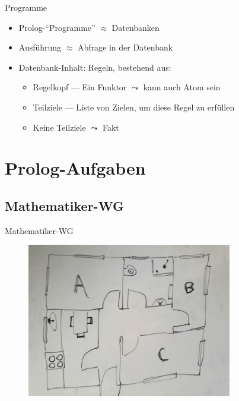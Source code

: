 \documentclass{beamer}
\begin{document}

\begin{frame}{Programme}
	\begin{itemize}
		\item Prolog-\enquote{Programme} $\approx$ Datenbanken
		\item Ausführung $\approx$ Abfrage in der Datenbank
		\item Datenbank-Inhalt: Regeln, bestehend aus:
		\begin{itemize}
			\item Regelkopf --- Ein Funktor $\leadsto$ kann auch Atom sein
			\item Teilziele --- Liste von Zielen, um diese Regel zu erfüllen
			\item Keine Teilziele $\leadsto$ Fakt
		\end{itemize}
	\end{itemize}
\end{frame}

\section{Prolog-Aufgaben}

\subsection{Mathematiker-WG}

\begin{frame}{Mathematiker-WG}
	\begin{figure}
		\includegraphics[width=0.8\textwidth]{images/mathematiker-wg}
	\end{figure}
\end{frame}
\end{document}

